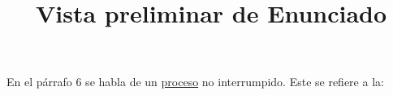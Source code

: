 \documentclass[a4paper,12pt]{article}\usepackage[utf8]{inputenc}\usepackage[spanish]{babel}\usepackage{times}
\title{Vista preliminar de Enunciado}
\begin{document}
\twocolumn 

\maketitle

En el párrafo 6 se habla de un \underline{proceso} no interrumpido. Este se refiere a la:
\end{document}
